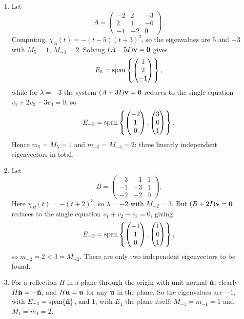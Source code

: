 \documentclass[a4paper]{scrartcl}
\begin{document}
\begin{example}[Multiplicities]
	\begin{enumerate}[label=(\roman*)]
		\item Let
		$$
		A = \begin{pmatrix}
			-2 & 2 & -3 \\ 2 & 1 & -6 \\ -1 & -2 & 0
		\end{pmatrix}.
		$$
		Computing, $\chi_A(t) = -(t - 5)(t+3)^2$, so the eigenvalues are $5$ and $-3$ with $M_5 = 1$, $M_{-3} = 2$. Solving $(A - 5I)\mathbf{v} = \mathbf{0}$ gives
		$$
		E_5 = \operatorname{span}\left\{\begin{pmatrix} 1 \\ 2 \\ -1 \end{pmatrix}\right\},
		$$
		while for $\lambda = -3$ the system $(A + 3I)\mathbf{v} = \mathbf{0}$ reduces to the single equation $v_1 + 2v_2 - 3v_3 = 0$, so
		$$
		E_{-3} = \operatorname{span}\left\{\begin{pmatrix} -2 \\ 1 \\ 0 \end{pmatrix}, \begin{pmatrix} 3 \\ 0 \\ 1\end{pmatrix}\right\}.
		$$
		Hence $m_5 = M_5 = 1$ and $m_{-3} = M_{-3} = 2$: three linearly independent eigenvectors in total.
		\item Let
		$$
		B = \begin{pmatrix}
			-3 & -1 & 1 \\ -1 & -3 & 1 \\ -2 & -2 & 0
		\end{pmatrix}.
		$$
		Here $\chi_B(t) = -(t + 2)^3$, so $\lambda = -2$ with $M_{-2} = 3$. But $(B + 2I)\mathbf{v} = \mathbf{0}$ reduces to the single equation $v_1 + v_2 - v_3 = 0$, giving
		$$
		E_{-2} = \operatorname{span}\left\{\begin{pmatrix} -1 \\ 1 \\ 0\end{pmatrix}, \begin{pmatrix} 1 \\ 0 \\ 1 \end{pmatrix}\right\},
		$$
		so $m_{-2} = 2 < 3 = M_{-2}$. There are only two independent eigenvectors to be found.
		\item For a reflection $H$ in a plane through the origin with unit normal $\hat{\mathbf{n}}$: clearly $H \hat{\mathbf{n}} = -\hat{\mathbf{n}}$, and $H\mathbf{u} = \mathbf{u}$ for any $\mathbf{u}$ in the plane. So the eigenvalues are $-1$, with $E_{-1} = \operatorname{span}\{\hat{\mathbf{n}}\}$, and $1$, with $E_1$ the plane itself: $M_{-1} = m_{-1} = 1$ and $M_1 = m_1 = 2$.

\end{enumerate}
\end{example}
\end{document}
